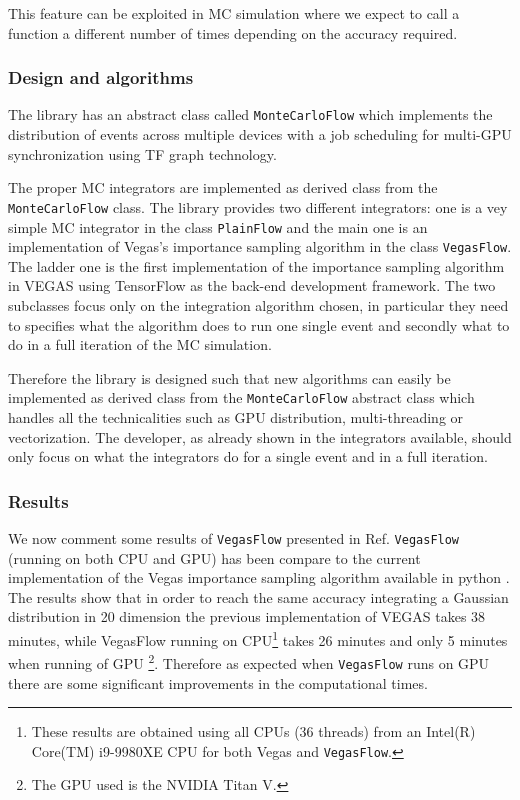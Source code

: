 \documentclass[../main/main.tex]{subfiles}
\begin{document}
This feature can be exploited in MC simulation where we expect to call a function a different number of times depending on the accuracy required. 

\subsubsection{Design and algorithms}
The library has an abstract class called \texttt{MonteCarloFlow} which implements the distribution
of events across multiple devices with a job scheduling for multi-GPU synchronization using TF graph technology.

The proper MC integrators are implemented as derived class from the \texttt{MonteCarloFlow} class. The library provides two different integrators: one is a vey simple MC integrator in the class \texttt{PlainFlow} and the main one is an implementation of Vegas's importance sampling algorithm in the class \texttt{VegasFlow}.
The ladder one is the first implementation of the importance sampling algorithm in VEGAS using TensorFlow as the back-end development framework.
The two subclasses focus only on the integration algorithm chosen, in particular they need to specifies what the algorithm does to run one single event and secondly what to do in a full iteration of the MC simulation.

Therefore the library is designed such that new algorithms can easily be implemented as derived class from the \texttt{MonteCarloFlow} abstract class which handles all the technicalities such as GPU distribution, multi-threading or vectorization.
The developer, as already shown in the integrators available, should only focus on what the integrators do for a single event and in a full iteration.

 
 \subsubsection{Results}
We now comment some results of \texttt{VegasFlow} presented in Ref\cite{Carrazza:2020rdn}.
\texttt{VegasFlow} (running on both CPU and GPU) has been compare to the current implementation of the Vegas importance sampling algorithm available in python \cite{peter_lepage_2021_4746454}. The results show that in order to reach the same accuracy integrating a Gaussian distribution in 20 dimension the previous implementation of VEGAS takes  38 minutes, while VegasFlow running on CPU\footnote{These results are obtained using all CPUs (36 threads) from an Intel(R) Core(TM) i9-9980XE CPU for both Vegas and \texttt{VegasFlow}.} takes 26 minutes and only 5 minutes when running of GPU \footnote{The GPU used is the NVIDIA Titan V.}.
Therefore as expected when \texttt{VegasFlow} runs on GPU there are some significant improvements in the computational times.
\end{document}
